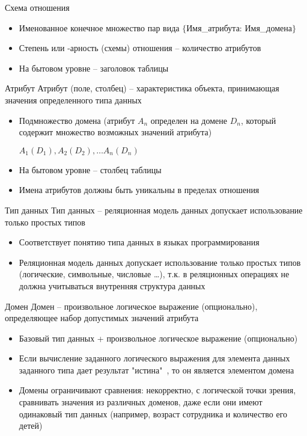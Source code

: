 \documentclass[12pt]{article}
\begin{document}
\begin{defin}{Схема отношения}
    \begin{itemize}
        \item Именованное конечное множество пар вида $\{$Имя\_атрибута: Имя\_домена$\}$
        \item Степень или -арность (схемы) отношения -- количество атрибутов
        \item На бытовом уровне -- заголовок таблицы 
    \end{itemize}
\end{defin}

\begin{defin}{Атрибут}
    Атрибут (поле, столбец) -- характеристика объекта, принимающая значения определенного типа данных 

    \begin{itemize}
        \item Подмножество домена (атрибут $A_n$ определен на домене $D_n$, который содержит множество возможных значений атрибута)
        
        $A_1(D_1), A_2(D_2), \ldots A_n(D_n)$

        \item На бытовом уровне -- столбец таблицы 
        \item Имена атрибутов должны быть уникальны в пределах отношения 
    \end{itemize}
\end{defin}

\begin{defin}{Тип данных}
    Тип данных -- реляционная модель данных допускает использование только простых типов 

    \begin{itemize}
        \item Соответствует понятию типа данных в языках программирования 
        \item Реляционная модель данных допускает использование только простых типов (логические, символьные, числовые \dots), т.к. в реляционных операциях не должна учитываться внутренняя структура данных 
    \end{itemize}
\end{defin}

\begin{defin}{Домен}
    Домен -- произвольное логическое выражение (опционально), определяющее набор допустимых значений атрибута 

    \begin{itemize}
        \item Базовый тип данных + произвольное логическое выражение (опционально)
        \item Если вычисление заданного логического выражения для элемента данных заданного типа дает результат "истина"\ , то он является элементом домена
        \item Домены ограничивают сравнения: некорректно, с логической точки зрения, сравнивать значения из различных доменов, даже если они имеют одинаковый тип данных (например, возраст сотрудника и количество его детей)
    \end{itemize}
\end{defin}
\end{document}

